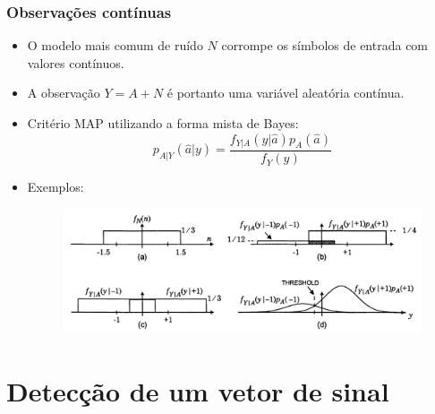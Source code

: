 \begin{frame}
	\frametitle{Observações contínuas}

	\begin{itemize}
	    \item O modelo mais comum de ruído $N$ corrompe os símbolos de entrada com valores contínuos.
	    \item A observação $Y=A+N$ é portanto uma variável aleatória contínua.
	    \item Critério MAP utilizando a forma mista de Bayes:
	    \begin{equation*}
		  p_{A|Y}(\hat{a}|y) = \frac{f_{Y|A}(y|\hat{a}) p_A(\hat{a})}{f_Y(y)}
	      \end{equation*}
	      \item Exemplos:
	    \begin{figure}[t]	
	      \begin{center}
		\includegraphics[width=0.8\columnwidth]{figs/detec_03}
	      \end{center}
	    \end{figure}
	\end{itemize}			
\end{frame}

\section{Detecção de um vetor de sinal}

